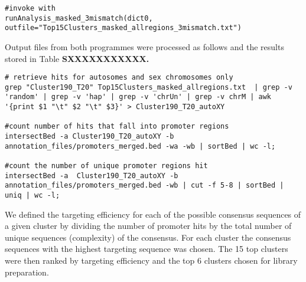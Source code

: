 \begin{footnotesize}
\begin{lstlisting}
#invoke with 
runAnalysis_masked_3mismatch(dict0, outfile="Top15Clusters_masked_allregions_3mismatch.txt")
\end{lstlisting}

Output files from both programmes were processed as follows and the results stored in Table\textbf{ SXXXXXXXXXXX.}

\begin{lstlisting}
# retrieve hits for autosomes and sex chromosomes only
grep "Cluster190_T20" Top15Clusters_masked_allregions.txt  | grep -v 'random' | grep -v 'hap' | grep -v 'chrUn' | grep -v chrM | awk '{print $1 "\t" $2 "\t" $3}' > Cluster190_T20_autoXY 

#count number of hits that fall into promoter regions
intersectBed -a Cluster190_T20_autoXY -b annotation_files/promoters_merged.bed -wa -wb | sortBed | wc -l;    

#count the number of unique promoter regions hit
intersectBed -a  Cluster190_T20_autoXY -b  annotation_files/promoters_merged.bed -wb | cut -f 5-8 | sortBed | uniq | wc -l;
\end{lstlisting}

We defined the targeting efficiency for each of the possible consensus sequences of a given cluster by dividing the number of promoter hits by the total number of unique sequences (complexity) of the consensus. For each cluster the consensus sequences with the highest targeting sequence was chosen. The 15 top clusters were then ranked by targeting efficiency and the top 6 clusters chosen for library preparation.

\end{footnotesize}
